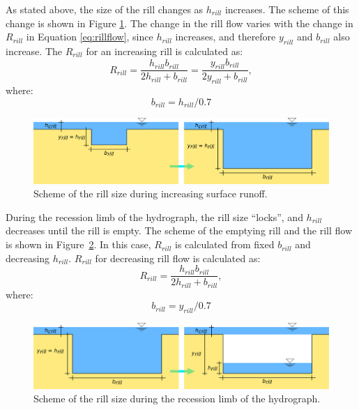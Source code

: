 As stated above, the size of the rill changes as $h_{rill}$ increases. The
scheme of this change is shown in Figure \ref{fig:rill_plneni}. The change in
the rill flow varies with the change in $R_{rill}$ in Equation
\ref{eq:rillflow}, since $h_{rill}$ increases, and therefore $y_{rill}$ and
$b_{rill}$ also increase. The $R_{rill}$ for an increasing rill is calculated
as:
\begin{equation}
    R_{rill} = \frac{h_{rill}b_{rill}}{2h_{rill}+b_{rill}}  =
    \frac{y_{rill}b_{rill}}{2y_{rill}+b_{rill}},
  \label{eq:rrill}
\end{equation}
where:
\begin{equation}
  b_{rill} = h_{rill}/0.7
  \label{eq:brill}
\end{equation}


\begin{figure}[b]
    \centering
    \includegraphics[width=1\linewidth]{./img/rill_schema_plneni.png}
    \caption{Scheme of the rill size during increasing surface runoff.}
    \label{fig:rill_plneni}
\end{figure}


During the recession limb of the hydrograph, the rill size “locks”, and
$h_{rill}$ decreases until the rill is empty. The scheme of the emptying rill
and the rill flow is shown in Figure~\ref{fig:rill_prazdneni}. In this case,
$R_{rill}$ is calculated from fixed $b_{rill}$ and decreasing $h_{rill}$.
$R_{rill}$ for decreasing rill flow is calculated as:
\begin{equation}
    R_{rill} = \frac{h_{rill}b_{rill}}{2h_{rill}+b_{rill}},
  \label{eq:rrill2}
\end{equation}
where:
\begin{equation}
  b_{rill} = y_{rill}/0.7
  \label{eq:brill2}
\end{equation}

\begin{figure}[t]
    \includegraphics[width=1\linewidth]{./img/rill_schema_prazdneni.png}
    \caption{Scheme of the rill size during the recession limb of the hydrograph.}
    \label{fig:rill_prazdneni}
\end{figure}

